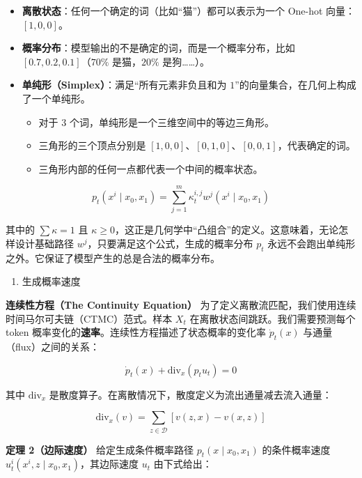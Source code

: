 \begin{itemize}
\tightlist
\item
  \textbf{离散状态}：任何一个确定的词（比如``猫''）都可以表示为一个 One-hot 向量：\([1,0,0]\)。
\item
  \textbf{概率分布}：模型输出的不是确定的词，而是一个概率分布，比如 \([0.7,0.2,0.1]\)（\(70\%\) 是猫，\(20\%\) 是狗\ldots\ldots）。
\item
  \textbf{单纯形（Simplex）}：满足``所有元素非负且和为 \(1\)''的向量集合，在几何上构成了一个单纯形。

  \begin{itemize}
  \tightlist
  \item
    对于 3 个词，单纯形是一个三维空间中的等边三角形。
  \item
    三角形的三个顶点分别是 \([1,0,0]\)、\([0,1,0]\)、\([0,0,1]\)，代表确定的词。
  \item
    三角形内部的任何一点都代表一个中间的概率状态。
  \end{itemize}
\end{itemize}

\[
p_t(x^i\mid x_0,x_1)=\sum_{j=1}^{m}\kappa_t^{i,j}w^j(x^i\mid x_0,x_1)
\]

其中的 \(\sum \kappa=1\) 且 \(\kappa\ge 0\)，这正是几何学中``凸组合''的定义。这意味着，无论怎样设计基础路径 \(w^j\)，只要满足这个公式，生成的概率分布 \(p_t\) 永远不会跑出单纯形之外。它保证了模型产生的总是合法的概率分布。

\begin{enumerate}
\def\labelenumi{\arabic{enumi}.}
\setcounter{enumi}{1}
\tightlist
\item
  生成概率速度
\end{enumerate}

\textbf{连续性方程（The Continuity Equation）} 为了定义离散流匹配，我们使用连续时间马尔可夫链（CTMC）范式。样本 \(X_t\) 在离散状态间跳跃。我们需要预测每个 token 概率变化的\textbf{速率}。连续性方程描述了状态概率的变化率 \(\dot{p}_t(x)\) 与通量（flux）之间的关系：

\[
\dot{p}_t(x)+\mathrm{div}_x(p_tu_t)=0
\]

其中 \(\mathrm{div}_x\) 是散度算子。在离散情况下，散度定义为流出通量减去流入通量：

\[
\mathrm{div}_x(v)=\sum_{z\in\mathcal{D}}[v(z,x)-v(x,z)]
\]

\textbf{定理 2（边际速度）} 给定生成条件概率路径 \(p_t(x\mid x_0,x_1)\) 的条件概率速度 \(u_t^i(x^i,z\mid x_0,x_1)\)，其边际速度 \(u_t\) 由下式给出：

